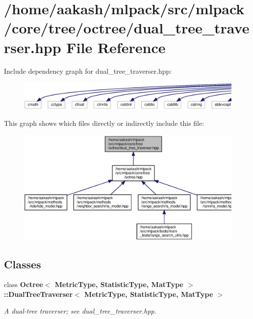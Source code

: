 \section{/home/aakash/mlpack/src/mlpack/core/tree/octree/dual\+\_\+tree\+\_\+traverser.hpp File Reference}
\label{octree_2dual__tree__traverser_8hpp}
Include dependency graph for dual\+\_\+tree\+\_\+traverser.\+hpp\+:
\nopagebreak
\begin{figure}[H]
\begin{center}
\leavevmode
\includegraphics[width=350pt]{octree_2dual__tree__traverser_8hpp__incl}
\end{center}
\end{figure}
This graph shows which files directly or indirectly include this file\+:
\nopagebreak
\begin{figure}[H]
\begin{center}
\leavevmode
\includegraphics[width=350pt]{octree_2dual__tree__traverser_8hpp__dep__incl}
\end{center}
\end{figure}
\subsection*{Classes}
\begin{DoxyCompactItemize}
\item 
class \textbf{ Octree$<$ Metric\+Type, Statistic\+Type, Mat\+Type $>$\+::\+Dual\+Tree\+Traverser$<$ Metric\+Type, Statistic\+Type, Mat\+Type $>$}
\begin{DoxyCompactList}\small\item\em A dual-\/tree traverser; see dual\+\_\+tree\+\_\+traverser.\+hpp. \end{DoxyCompactList}\end{DoxyCompactItemize}
